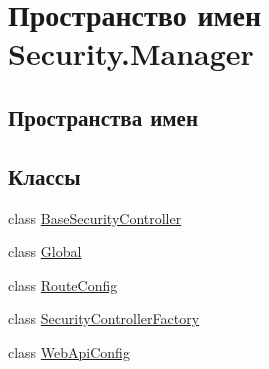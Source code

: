 \hypertarget{namespace_security_1_1_manager}{}\section{Пространство имен Security.\+Manager}
\label{namespace_security_1_1_manager}
\subsection*{Пространства имен}
\begin{DoxyCompactItemize}
\end{DoxyCompactItemize}
\subsection*{Классы}
\begin{DoxyCompactItemize}
\item 
class \hyperlink{class_security_1_1_manager_1_1_base_security_controller}{Base\+Security\+Controller}
\item 
class \hyperlink{class_security_1_1_manager_1_1_global}{Global}
\item 
class \hyperlink{class_security_1_1_manager_1_1_route_config}{Route\+Config}
\item 
class \hyperlink{class_security_1_1_manager_1_1_security_controller_factory}{Security\+Controller\+Factory}
\item 
class \hyperlink{class_security_1_1_manager_1_1_web_api_config}{Web\+Api\+Config}
\end{DoxyCompactItemize}
